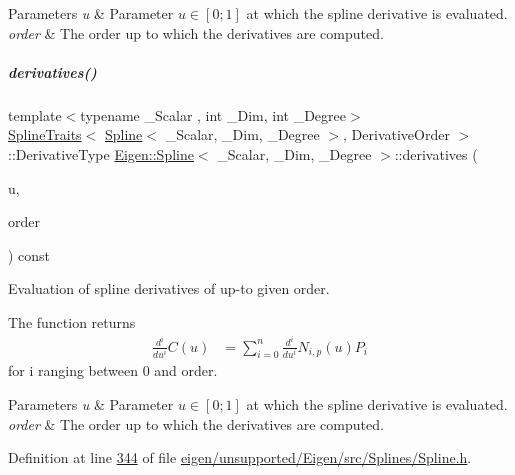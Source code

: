 \begin{DoxyParams}{Parameters}
{\em u} & Parameter $u \in [0;1]$ at which the spline derivative is evaluated. \\
\hline
{\em order} & The order up to which the derivatives are computed. \\
\hline
\end{DoxyParams}
\mbox{\label{group___splines___module_a196730cf190dfa16907db888277e5aed}} 
\subparagraph{\texorpdfstring{derivatives()}{derivatives()}\hspace{0.1cm}{\footnotesize\ttfamily [2/4]}}
{\footnotesize\ttfamily template$<$typename \+\_\+\+Scalar , int \+\_\+\+Dim, int \+\_\+\+Degree$>$ \\
\hyperlink{struct_eigen_1_1_spline_traits}{Spline\+Traits}$<$ \hyperlink{group___splines___module_class_eigen_1_1_spline}{Spline}$<$ \+\_\+\+Scalar, \+\_\+\+Dim, \+\_\+\+Degree $>$, Derivative\+Order $>$\+::Derivative\+Type \hyperlink{group___splines___module_class_eigen_1_1_spline}{Eigen\+::\+Spline}$<$ \+\_\+\+Scalar, \+\_\+\+Dim, \+\_\+\+Degree $>$\+::derivatives (\begin{DoxyParamCaption}\item[{\hyperlink{group___splines___module_a8cafd78b564825c76fbb3419653d9742}{Scalar}}]{u,  }\item[{Dense\+Index}]{order }\end{DoxyParamCaption}) const}



Evaluation of spline derivatives of up-\/to given order. 

The function returns \begin{align*} \frac{d^i}{du^i}C(u) & = \sum_{i=0}^{n} \frac{d^i}{du^i} N_{i,p}(u)P_i \end{align*} for i ranging between 0 and order.


\begin{DoxyParams}{Parameters}
{\em u} & Parameter $u \in [0;1]$ at which the spline derivative is evaluated. \\
\hline
{\em order} & The order up to which the derivatives are computed. \\
\hline
\end{DoxyParams}


Definition at line \hyperlink{eigen_2unsupported_2_eigen_2src_2_splines_2_spline_8h_source_l00344}{344} of file \hyperlink{eigen_2unsupported_2_eigen_2src_2_splines_2_spline_8h_source}{eigen/unsupported/\+Eigen/src/\+Splines/\+Spline.\+h}.

